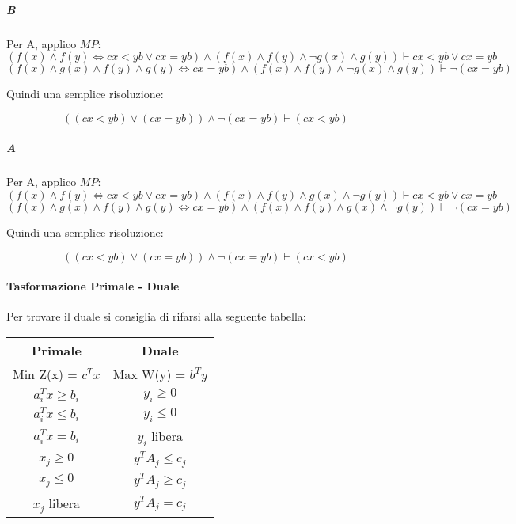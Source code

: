 \subparagraph{B}

Per A, applico $MP$:
\[
    (f(x) \land f(y) \Leftrightarrow cx < yb \lor cx = yb) \land (f(x) \land f(y) \land \neg g(x) \land g(y)) \vdash cx < yb \lor cx = yb
\]
\[
    (f(x) \land g(x) \land f(y) \land g(y) \Leftrightarrow cx = yb) \land (f(x) \land f(y) \land \neg g(x) \land g(y)) \vdash \neg (cx = yb)
\]

Quindi una semplice risoluzione:

\[
    ((cx < yb) \lor (cx = yb)) \land \neg (cx = yb) \vdash (cx < yb)
\]

\subparagraph{A}

Per A, applico $MP$:
\[
    (f(x) \land f(y) \Leftrightarrow cx < yb \lor cx = yb) \land (f(x) \land f(y) \land g(x) \land \neg g(y)) \vdash cx < yb \lor cx = yb
\]
\[
    (f(x) \land g(x) \land f(y) \land g(y) \Leftrightarrow cx = yb) \land (f(x) \land f(y) \land g(x) \land \neg g(y)) \vdash \neg (cx = yb)
\]

Quindi una semplice risoluzione:

\[
    ((cx < yb) \lor (cx = yb)) \land \neg (cx = yb) \vdash (cx < yb)
\]

\paragraph{Tasformazione Primale - Duale}

Per trovare il duale si consiglia di rifarsi alla seguente tabella:

\begin{center}
    \begin{tabular}{||c | c||}
        \hline
        Primale & Duale \\
        \hline
        \hline
        Min Z(x) = $c^Tx$ & Max W(y) = $b^Ty$ \\
        \hline
        $a^T_ix \geq b_i$ & $y_i \geq 0$ \\
        \hline
        $a^T_ix \leq b_i$ & $y_i \leq 0$ \\
        \hline
        $a^T_ix = b_i$ & $y_i$ libera \\
        \hline
        $x_j \geq 0$ & $y^TA_j \leq c_j$ \\
        \hline
        $x_j \leq 0$ & $y^TA_j \geq c_j$ \\
        \hline
        $x_j$ libera & $y^TA_j = c_j$ \\
        \hline
    \end{tabular}
\end{center}
